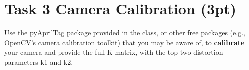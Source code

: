 \documentclass[english]{article}
\begin{document}

\clearpage

\section{Task 3 Camera Calibration (3pt)}

Use the pyAprilTag package provided in the class, or other free packages (e.g., OpenCV’s camera calibration toolkit) that you may be aware of, to \textbf{calibrate} your camera and provide the full K matrix, with the top two distortion parameters k1 and k2.

\end{document}
